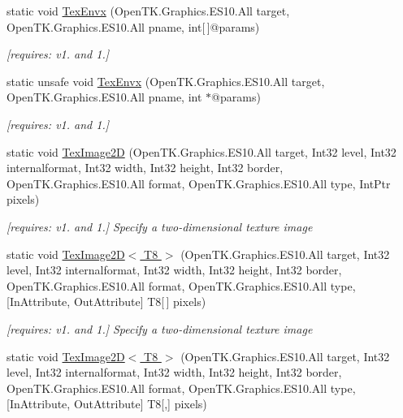 \begin{DoxyCompactItemize}
static void \hyperlink{class_open_t_k_1_1_graphics_1_1_e_s10_1_1_g_l_ac4d6b9ac52e55c855f715b4b7ab1b060}{Tex\-Envx} (Open\-T\-K.\-Graphics.\-E\-S10.\-All target, Open\-T\-K.\-Graphics.\-E\-S10.\-All pname, int\mbox{[}$\,$\mbox{]}@params)
\begin{DoxyCompactList}\small\item\em \mbox{[}requires\-: v1. and 1.\mbox{]}\end{DoxyCompactList}\item 
static unsafe void \hyperlink{class_open_t_k_1_1_graphics_1_1_e_s10_1_1_g_l_a58ffa84569f4800f989b8899107798f9}{Tex\-Envx} (Open\-T\-K.\-Graphics.\-E\-S10.\-All target, Open\-T\-K.\-Graphics.\-E\-S10.\-All pname, int $\ast$@params)
\begin{DoxyCompactList}\small\item\em \mbox{[}requires\-: v1. and 1.\mbox{]}\end{DoxyCompactList}\item 
static void \hyperlink{class_open_t_k_1_1_graphics_1_1_e_s10_1_1_g_l_ac867d2e23d7d65da73d796e60e47c552}{Tex\-Image2\-D} (Open\-T\-K.\-Graphics.\-E\-S10.\-All target, Int32 level, Int32 internalformat, Int32 width, Int32 height, Int32 border, Open\-T\-K.\-Graphics.\-E\-S10.\-All format, Open\-T\-K.\-Graphics.\-E\-S10.\-All type, Int\-Ptr pixels)
\begin{DoxyCompactList}\small\item\em \mbox{[}requires\-: v1. and 1.\mbox{]} Specify a two-\/dimensional texture image \end{DoxyCompactList}\item 
static void \hyperlink{class_open_t_k_1_1_graphics_1_1_e_s10_1_1_g_l_ae4f08e77ade212f674d843e7507a8fb5}{Tex\-Image2\-D$<$ T8 $>$} (Open\-T\-K.\-Graphics.\-E\-S10.\-All target, Int32 level, Int32 internalformat, Int32 width, Int32 height, Int32 border, Open\-T\-K.\-Graphics.\-E\-S10.\-All format, Open\-T\-K.\-Graphics.\-E\-S10.\-All type, \mbox{[}In\-Attribute, Out\-Attribute\mbox{]} T8\mbox{[}$\,$\mbox{]} pixels)
\begin{DoxyCompactList}\small\item\em \mbox{[}requires\-: v1. and 1.\mbox{]} Specify a two-\/dimensional texture image \end{DoxyCompactList}\item 
static void \hyperlink{class_open_t_k_1_1_graphics_1_1_e_s10_1_1_g_l_afd52e869505786ac00fdb3ae9df05033}{Tex\-Image2\-D$<$ T8 $>$} (Open\-T\-K.\-Graphics.\-E\-S10.\-All target, Int32 level, Int32 internalformat, Int32 width, Int32 height, Int32 border, Open\-T\-K.\-Graphics.\-E\-S10.\-All format, Open\-T\-K.\-Graphics.\-E\-S10.\-All type, \mbox{[}In\-Attribute, Out\-Attribute\mbox{]} T8\mbox{[},\mbox{]} pixels)

\end{DoxyCompactItemize}
